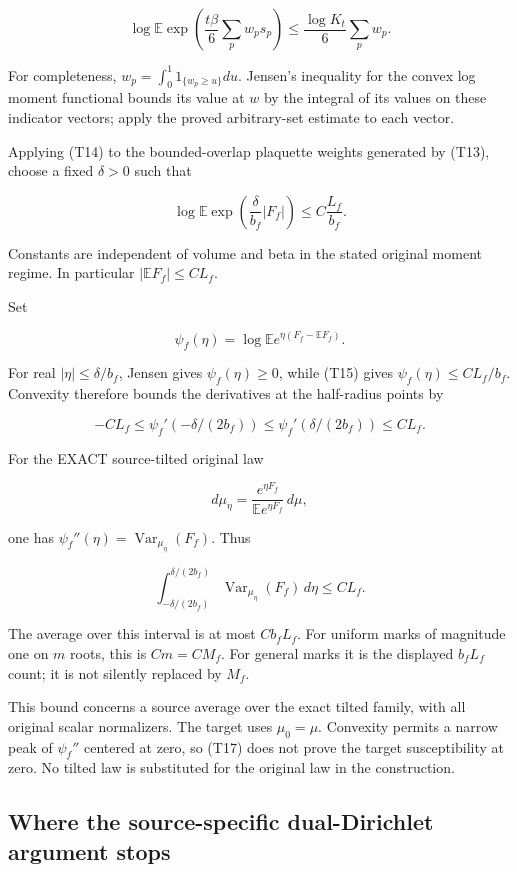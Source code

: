 \documentclass[
  11pt,
]{article}
\begin{document}
\[
 \log\mathbb E\exp\left(\frac{t\beta}{6}\sum_pw_ps_p\right)
 \le\frac{\log K_t}{6}\sum_pw_p.
 \tag{T14}
\]

For completeness, \(w_p=\int_0^1 1_{\{w_p\ge u\}}du\). Jensen's
inequality for the convex log moment functional bounds its value at
\(w\) by the integral of its values on these indicator vectors; apply
the proved arbitrary-set estimate to each vector.

Applying (T14) to the bounded-overlap plaquette weights generated by
(T13), choose a fixed \(\delta>0\) such that

\[
 \log\mathbb E\exp\left(\frac\delta{b_f}|F_f|\right)
 \le C\frac{L_f}{b_f}.
 \tag{T15}
\]

Constants are independent of volume and beta in the stated original
moment regime. In particular \(|\mathbb EF_f|\le CL_f\).

Set

\[
 \psi_f(\eta)=\log\mathbb E
            e^{\eta(F_f-\mathbb EF_f)}.
\]

For real \(|\eta|\le\delta/b_f\), Jensen gives \(\psi_f(\eta)\ge0\),
while (T15) gives \(\psi_f(\eta)\le C L_f/b_f\). Convexity therefore
bounds the derivatives at the half-radius points by

\[
 -CL_f\le\psi_f'(-\delta/(2b_f))
 \le\psi_f'(\delta/(2b_f))\le CL_f.
 \tag{T16}
\]

For the EXACT source-tilted original law

\[
 d\mu_\eta=\frac{e^{\eta F_f}}{\mathbb E e^{\eta F_f}}\,d\mu,
\]

one has \(\psi_f''(\eta)=\operatorname{Var}_{\mu_\eta}(F_f)\). Thus

\[
 \boxed{
 \int_{-\delta/(2b_f)}^{\delta/(2b_f)}
       \operatorname{Var}_{\mu_\eta}(F_f)\,d\eta
 \le CL_f.}
 \tag{T17}
\]

The average over this interval is at most \(Cb_fL_f\). For uniform marks
of magnitude one on \(m\) roots, this is \(Cm=CM_f\). For general marks
it is the displayed \(b_fL_f\) count; it is not silently replaced by
\(M_f\).

This bound concerns a source average over the exact tilted family, with
all original scalar normalizers. The target uses \(\mu_0=\mu\).
Convexity permits a narrow peak of \(\psi_f''\) centered at zero, so
(T17) does not prove the target susceptibility at zero. No tilted law is
substituted for the original law in the construction.

\hypertarget{where-the-source-specific-dual-dirichlet-attempt-stops}{%
\subsection{Where the source-specific dual-Dirichlet argument
stops}\label{where-the-source-specific-dual-dirichlet-attempt-stops}}
\end{document}
